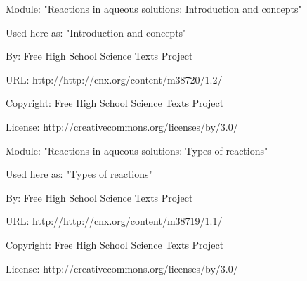       \par\vspace{9pt}\noindent\begin{minipage}{\textwidth}
      Module: "Reactions in aqueous solutions: Introduction and concepts" \par\nopagebreak\noindent
      Used here as: "Introduction and concepts" \par\nopagebreak\noindent
        By: Free High School Science Texts Project\par\nopagebreak\noindent
      URL: http://http://cnx.org/content/m38720/1.2/\par\nopagebreak\noindent
      \par\nopagebreak\noindent
      Copyright: Free High School Science Texts Project\par\nopagebreak\noindent
      License:  http://creativecommons.org/licenses/by/3.0/\par\nopagebreak\noindent
      \par\end{minipage}
      \par\vspace{9pt}\noindent\begin{minipage}{\textwidth}
      Module: "Reactions in aqueous solutions: Types of reactions" \par\nopagebreak\noindent
      Used here as: "Types of reactions" \par\nopagebreak\noindent
        By: Free High School Science Texts Project\par\nopagebreak\noindent
      URL: http://http://cnx.org/content/m38719/1.1/\par\nopagebreak\noindent
      \par\nopagebreak\noindent
      Copyright: Free High School Science Texts Project\par\nopagebreak\noindent
      License:  http://creativecommons.org/licenses/by/3.0/\par\nopagebreak\noindent
      \par\end{minipage}
